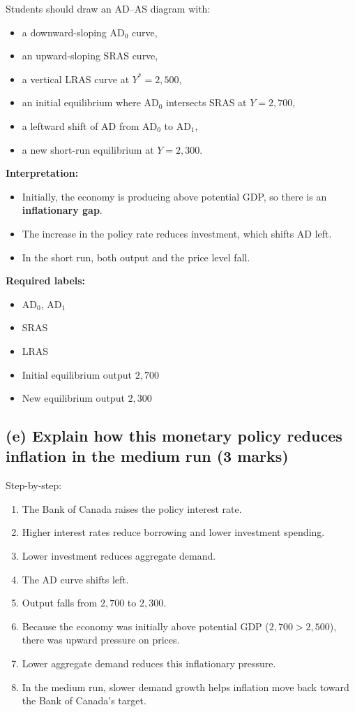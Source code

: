 \documentclass[12pt]{article}
\begin{document}
Students should draw an AD--AS diagram with:

\begin{itemize}
    \item a downward-sloping \(\text{AD}_0\) curve,
    \item an upward-sloping SRAS curve,
    \item a vertical LRAS curve at \(Y^* = 2{,}500\),
    \item an initial equilibrium where \(\text{AD}_0\) intersects SRAS at \(Y = 2{,}700\),
    \item a leftward shift of AD from \(\text{AD}_0\) to \(\text{AD}_1\),
    \item a new short-run equilibrium at \(Y = 2{,}300\).
\end{itemize}

\textbf{Interpretation:}
\begin{itemize}
    \item Initially, the economy is producing above potential GDP, so there is an \textbf{inflationary gap}.
    \item The increase in the policy rate reduces investment, which shifts AD left.
    \item In the short run, both output and the price level fall.
\end{itemize}
\newpage
\textbf{Required labels:}
\begin{itemize}
    \item AD\(_0\), AD\(_1\)
    \item SRAS
    \item LRAS
    \item Initial equilibrium output \(2{,}700\)
    \item New equilibrium output \(2{,}300\)
\end{itemize}

\subsection*{(e) Explain how this monetary policy reduces inflation in the medium run (3 marks)}

Step-by-step:

\begin{enumerate}
    \item The Bank of Canada raises the policy interest rate.
    \item Higher interest rates reduce borrowing and lower investment spending.
    \item Lower investment reduces aggregate demand.
    \item The AD curve shifts left.
    \item Output falls from \(2{,}700\) to \(2{,}300\).
    \item Because the economy was initially above potential GDP (\(2{,}700 > 2{,}500\)), there was upward pressure on prices.
    \item Lower aggregate demand reduces this inflationary pressure.
    \item In the medium run, slower demand growth helps inflation move back toward the Bank of Canada's target.
\end{enumerate}
\end{document}
